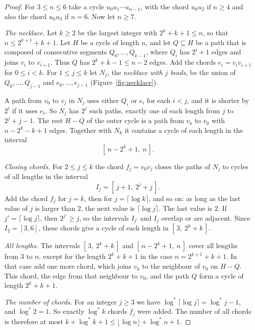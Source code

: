 \documentclass[11pt]{article}
\theoremstyle{definition}
\theoremstyle{remark}
\newcommand{\lgs}{\log^{*}}
\numberwithin{equation}{section}
\begin{document}
\begin{proof}
For $3\le n\le6$ take a cycle $u_0u_1\cdots u_{n-1}$, with the chord $u_0u_2$ if $n\ge4$ and also
the chord $u_0u_3$ if $n=6$. Now let $n\ge7$.

\emph{The necklace.} Let $k\ge2$ be the largest integer with $2^{k}+k+1\le n$, so that
$n\le2^{k+1}+k+1$. Let $H$ be a cycle of length $n$, and let $Q\subseteq H$ be a path that is
composed of consecutive segments $Q_0,\dots,Q_{k-1}$, where $Q_i$ has $2^{i}+1$ edges and joins
$v_i$ to $v_{i+1}$. Thus $Q$ has $2^{k}+k-1\le n-2$ edges. Add the chords $e_i=v_iv_{i+1}$ for
$0\le i<k$. For $1\le j\le k$ let $N_j$, the \emph{necklace with $j$ beads}, be the union of
$Q_0,\dots,Q_{j-1}$ and $e_0,\dots,e_{j-1}$ (Figure~\ref{fig:necklace}).

A path from $v_0$ to $v_j$ in $N_j$ uses either $Q_i$ or $e_i$ for each $i<j$, and it is shorter by
$2^{i}$ if it uses $e_i$. So $N_j$ has $2^{j}$ such paths, exactly one of each length from $j$ to
$2^{j}+j-1$. The rest $H-Q$ of the outer cycle is a path from $v_k$ to $v_0$ with $n-2^{k}-k+1$
edges. Together with $N_k$ it contains a cycle of each length in the interval
\[
  [\,n-2^{k}+1,\ n\,].
\]

\emph{Closing chords.} For $2\le j\le k$ the chord $f_j=v_0v_j$ closes the paths of $N_j$ to cycles
of all lengths in the interval
\[
  I_j=[\,j+1,\ 2^{j}+j\,].
\]
Add the chord $f_j$ for $j=k$, then for $j=\lceil\log k\rceil$, and so on: as long as the last
value of $j$ is larger than $2$, the next value is $\lceil\log j\rceil$. The last value is $2$. If
$j'=\lceil\log j\rceil$, then $2^{j'}\ge j$, so the intervals $I_{j'}$ and $I_j$ overlap or are
adjacent. Since $I_2=[3,6]$, these chords give a cycle of each length in $[\,3,\ 2^{k}+k\,]$.

\emph{All lengths.} The intervals $[\,3,\ 2^{k}+k\,]$ and $[\,n-2^{k}+1,\ n\,]$ cover all lengths
from $3$ to $n$, except for the length $2^{k}+k+1$ in the case $n=2^{k+1}+k+1$. In that case add
one more chord, which joins $v_k$ to the neighbour of $v_0$ on $H-Q$. This chord, the edge from that
neighbour to $v_0$, and the path $Q$ form a cycle of length $2^{k}+k+1$.

\emph{The number of chords.} For an integer $j\ge3$ we have $\lgs\lceil\log j\rceil=\lgs j-1$, and
$\lgs2=1$. So exactly $\lgs k$ chords $f_j$ were added. The number of all chords is therefore at
most $k+\lgs k+1\le\lfloor\log n\rfloor+\lgs n+1$.
\end{proof}
\end{document}
